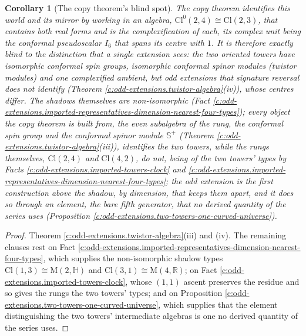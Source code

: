 \documentclass[11pt]{article}
\newtheorem{corollary}[theorem]{Corollary}
\theoremstyle{definition}
\theoremstyle{plain}
\newcommand{\changedmark}[2]{\marginpar{\raggedright\scriptsize\color{#1}#2}}
\providecommand{\CS}{}\renewcommand{\CS}{{\mathbb{S}^{+}}}
\providecommand{\Cl}{}\renewcommand{\Cl}{\mathrm{Cl}}
\providecommand{\HH}{}\renewcommand{\HH}{\mathbb{H}}
\providecommand{\Mat}{}\renewcommand{\Mat}{\mathrm{M}}
\providecommand{\R}{}\renewcommand{\R}{\mathbb{R}}
\begin{document}
\begin{corollary}[The copy theorem's blind spot]\label{c:odd-extensions.copy-theorems-blind-spot}
\changedmark{BurntOrange}{changed since the deposit}
The copy theorem identifies this world and its mirror by working in an algebra, $\Cl^{0}(2,4) \cong \Cl(2,3)$, that contains both real forms and is the complexification of each, its complex unit being the conformal pseudoscalar $I_6$ that spans its centre with $1$. It is therefore exactly blind to the distinction that a single extension sees: the two oriented towers have isomorphic conformal spin groups, isomorphic conformal spinor modules (twistor modules) and one complexified ambient, but odd extensions that signature reversal does not identify (Theorem \ref{c:odd-extensions.twistor-algebra}(iv)), whose centres differ. The shadows themselves are non-isomorphic (Fact \ref{c:odd-extensions.imported-representatives-dimension-nearest-four-types}); every object the copy theorem is built from, the even subalgebra of the rung, the conformal spin group and the conformal spinor module $\CS$ (Theorem \ref{c:odd-extensions.twistor-algebra}(iii)), identifies the two towers, while the rungs themselves, $\Cl(2,4)$ and $\Cl(4,2)$, do not, being of the two towers' types by Facts \ref{c:odd-extensions.imported-towers-clock} and \ref{c:odd-extensions.imported-representatives-dimension-nearest-four-types}; the odd extension is the first construction above the shadow, by dimension, that keeps them apart, and it does so through an element, the bare fifth generator, that no derived quantity of the series uses (Proposition \ref{c:odd-extensions.two-towers-one-curved-universe}).
\end{corollary}
\begin{proof}
Theorem \ref{c:odd-extensions.twistor-algebra}(iii) and (iv). The remaining clauses rest on Fact \ref{c:odd-extensions.imported-representatives-dimension-nearest-four-types}, which supplies the non-isomorphic shadow types $\Cl(1,3) \cong \Mat(2,\HH)$ and $\Cl(3,1) \cong \Mat(4,\R)$; on Fact \ref{c:odd-extensions.imported-towers-clock}, whose $(1,1)$ ascent preserves the residue and so gives the rungs the two towers' types; and on Proposition \ref{c:odd-extensions.two-towers-one-curved-universe}, which supplies that the element distinguishing the two towers' intermediate algebras is one no derived quantity of the series uses.

\end{proof}
\end{document}
